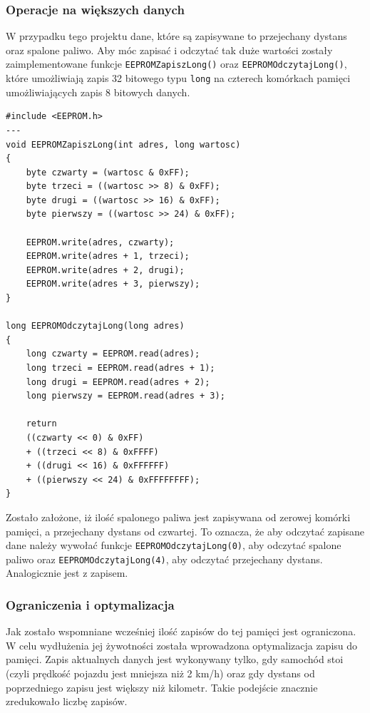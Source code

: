 \subsubsection{Operacje na większych danych}
W przypadku tego projektu dane, które są zapisywane to przejechany dystans oraz spalone paliwo. Aby móc zapisać i odczytać tak duże wartości zostały zaimplementowane funkcje \texttt{EEPROMZapiszLong()} oraz \texttt{EEPROMOdczytajLong()}, które umożliwiają zapis 32 bitowego typu \texttt{long} na czterech komórkach pamięci umożliwiających zapis 8 bitowych danych.

\begin{lstlisting}[label=list:eeprom_long,caption=Zapis i odczyt dużych liczb do/z EEPROM,
basicstyle=\footnotesize\ttfamily]
#include <EEPROM.h>
---
void EEPROMZapiszLong(int adres, long wartosc)
{
    byte czwarty = (wartosc & 0xFF);
    byte trzeci = ((wartosc >> 8) & 0xFF);
    byte drugi = ((wartosc >> 16) & 0xFF);
    byte pierwszy = ((wartosc >> 24) & 0xFF);
    
    EEPROM.write(adres, czwarty);
    EEPROM.write(adres + 1, trzeci);
    EEPROM.write(adres + 2, drugi);
    EEPROM.write(adres + 3, pierwszy);
}

long EEPROMOdczytajLong(long adres)
{
    long czwarty = EEPROM.read(adres);
    long trzeci = EEPROM.read(adres + 1);
    long drugi = EEPROM.read(adres + 2);
    long pierwszy = EEPROM.read(adres + 3);
    
    return 
    ((czwarty << 0) & 0xFF)
    + ((trzeci << 8) & 0xFFFF)
    + ((drugi << 16) & 0xFFFFFF) 
    + ((pierwszy << 24) & 0xFFFFFFFF);
}
\end{lstlisting}

Zostało założone, iż ilość spalonego paliwa jest zapisywana od zerowej komórki pamięci, a przejechany dystans od czwartej. To oznacza, że aby odczytać zapisane dane należy wywołać funkcje \texttt{EEPROMOdczytajLong(0)}, aby odczytać spalone paliwo oraz \texttt{EEPROMOdczytajLong(4)}, aby odczytać przejechany dystans. Analogicznie jest z zapisem.

\subsubsection{Ograniczenia i optymalizacja}

Jak zostało wspomniane wcześniej ilość zapisów do tej pamięci jest ograniczona. W celu wydłużenia jej żywotności została wprowadzona optymalizacja zapisu do pamięci. Zapis aktualnych danych jest wykonywany tylko, gdy samochód stoi (czyli prędkość pojazdu jest mniejsza niż 2 km/h) oraz gdy dystans od poprzedniego zapisu jest większy niż kilometr. Takie podejście znacznie zredukowało liczbę zapisów.